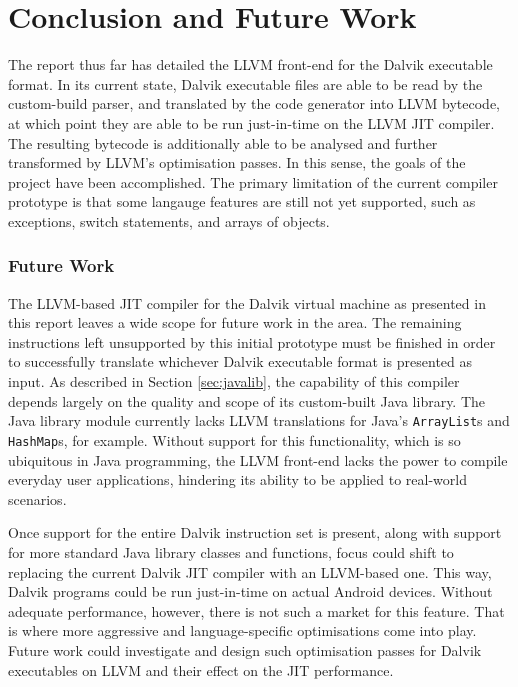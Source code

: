 \chapter{Conclusion and Future Work}
\label{chap:conclusion}

The report thus far has detailed the LLVM front-end for the Dalvik executable format. In its current state, Dalvik executable files are able to be read by the custom-build parser, and translated by the code generator into LLVM bytecode, at which point they are able to be run just-in-time on the LLVM JIT compiler. The resulting bytecode is additionally able to be analysed and further transformed by LLVM's optimisation passes. In this sense, the goals of the project have been accomplished. The primary limitation of the current compiler prototype is that some langauge features are still not yet supported, such as exceptions, switch statements, and arrays of objects.

\subsection*{Future Work}

The LLVM-based JIT compiler for the Dalvik virtual machine as presented in this report leaves a wide scope for future work in the area. The remaining instructions left unsupported by this initial prototype must be finished in order to successfully translate whichever Dalvik executable format is presented as input. As described in Section \ref{sec:javalib}, the capability of this compiler depends largely on the quality and scope of its custom-built Java library. The Java library module currently lacks LLVM translations for Java's \verb|ArrayList|s and \verb|HashMap|s, for example. Without support for this functionality, which is so ubiquitous in Java programming, the LLVM front-end lacks the power to compile everyday user applications, hindering its ability to be applied to real-world scenarios.

Once support for the entire Dalvik instruction set is present, along with support for more standard Java library classes and functions, focus could shift to replacing the current Dalvik JIT compiler with an LLVM-based one. This way, Dalvik programs could be run just-in-time on actual Android devices. Without adequate performance, however, there is not such a market for this feature. That is where more aggressive and language-specific optimisations come into play. Future work could investigate and design such optimisation passes for Dalvik executables on LLVM and their effect on the JIT performance.
